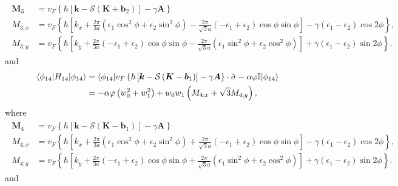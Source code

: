 \documentclass[10pt, oneside]{article}
\newcommand{\vph}{\varphi}
\newcommand{\p}[1]{\left(#1\right)}
\newcommand{\bb}[1]{\left[#1\right]}
\newcommand{\br}[1]{\left\{#1\right\}}
\begin{document}
\begin{align}
	\begin{split}
		\bm{M}_{3} & = v_{F} \br{\hbar \bb{\bm{k} - \mathcal{S} \p{\bm{K} + \bm{b}_{2}}} - \gamma \bm{A}} \\
		M_{3;x} & = v_{F} \br{\hbar \bb{k_{x}  + \frac{2 \pi}{3 a} \p{\epsilon_{1} \cos^{2} \phi + \epsilon_{2} \sin^{2} \phi} - \frac{2 \pi}{\sqrt{3} a}\p{-\epsilon_{1} + \epsilon_{2}} \cos{\phi} \sin{\phi}} - \gamma \p{\epsilon_{1} - \epsilon_{2}} \cos{2 \phi}},\\
		M_{3;y} & = v_{F} \br{\hbar \bb{k_{y} + \frac{2 \pi}{3 a} \p{-\epsilon_{1} + \epsilon_{2}} \cos{\phi} \sin{\phi} - \frac{2 \pi}{\sqrt{3} a}\p{\epsilon_{1} 	\sin^{2} \phi + \epsilon_{2} \cos^{2} \phi}} + \gamma \p{\epsilon_{1} - \epsilon_{2}} \sin{2 \phi}}.
	\end{split}
\end{align}
and
\begin{align}
	\begin{split}
		\braket{\phi_{14} | H_{14} | \phi_{14}} & = \braket{\phi_{14} | v_{F} \br{\hbar \bb{\bm{k} - \mathcal{S} \p{\bm{K} - \bm{b}_{1}}} - \gamma \bm{A}} \cdot \hat{\sigma} - \alpha \vph \mathbb{I} | \phi_{14} } \\
		& = - \alpha \vph \p{w_0^2 + w_1^2} + w_0 w_1 \p{M_{4;x} + \sqrt{3} M_{4;y}},
 	\end{split}
\end{align}
where 
\begin{align}
	\begin{split}
		\bm{M}_{4} & = v_{F} \br{\hbar \bb{\bm{k} - \mathcal{S} \p{\bm{K} - \bm{b}_1}} - \gamma \bm{A}} \\
		M_{4;x} & = v_{F} \br{\hbar \bb{k_{x} + \frac{2 \pi}{3 a} \p{\epsilon_{1} \cos^{2} \phi + \epsilon_{2} \sin^{2} \phi} + \frac{2 \pi}{\sqrt{3} a} \p{-\epsilon_{1} + \epsilon_{2}} \cos{\phi} \sin{\phi}} - \gamma \p{\epsilon_{1} - \epsilon_{2}} \cos{2 \phi}},\\
		M_{4;y} & = v_{F} \br{\hbar \bb{k_{y} + \frac{2 \pi}{3 a} \p{-\epsilon_{1} + \epsilon_2} \cos{\phi} \sin{\phi} + \frac{2 \pi}{\sqrt{3} a} \p{\epsilon_{1} \sin^2 \phi + \epsilon_2 \cos^2 \phi}} + \gamma \p{\epsilon_{1} - \epsilon_{2}} \sin{2 \phi}}.
	\end{split}
\end{align}
and 
\end{document}
